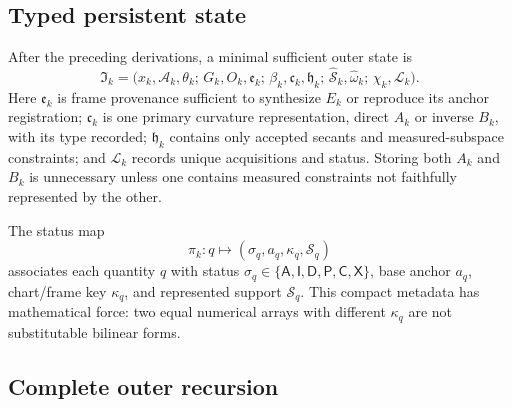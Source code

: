 \documentclass[10pt,twocolumn]{article}
\newcommand{\mathscr}[1]{\mathcal{#1}}
\theoremstyle{definition}
\theoremstyle{remark}
\newcommand{\A}{\mathsf A}
\newcommand{\I}{\mathsf I}
\newcommand{\D}{\mathsf D}
\newcommand{\Prd}{\mathsf P}
\newcommand{\Cor}{\mathsf C}
\newcommand{\Inv}{\mathsf X}
\begin{document}
\subsection{Typed persistent state}

After the preceding derivations, a minimal sufficient outer state is
\begin{equation}
 \mathfrak I_k=
 \bigl(
 x_k,\mathcal A_k,\theta_k;\,
 G_k,O_k,\mathfrak e_k;\,
 \beta_k,\mathfrak c_k,\mathfrak h_k;\,
 \widehat{\mathcal S}_k,\widehat\omega_k;\,
 \chi_k,\mathscr L_k
 \bigr).
 \label{eq:minstate}
\end{equation}
Here $\mathfrak e_k$ is frame provenance sufficient to synthesize $E_k$ or reproduce its anchor registration; $\mathfrak c_k$ is one primary curvature representation, direct $A_k$ or inverse $B_k$, with its type recorded; $\mathfrak h_k$ contains only accepted secants and measured-subspace constraints; and $\mathscr L_k$ records unique acquisitions and status.  Storing both $A_k$ and $B_k$ is unnecessary unless one contains measured constraints not faithfully represented by the other.

The status map
\begin{equation}
 \pi_k:q\longmapsto(\sigma_q,a_q,\kappa_q,\mathcal S_q)
 \label{eq:provenance}
\end{equation}
associates each quantity $q$ with status $\sigma_q\in\{\A,\I,\D,\Prd,\Cor,\Inv\}$, base anchor $a_q$, chart/frame key $\kappa_q$, and represented support $\mathcal S_q$.  This compact metadata has mathematical force: two equal numerical arrays with different $\kappa_q$ are not substitutable bilinear forms.

\subsection{Complete outer recursion}
\end{document}

